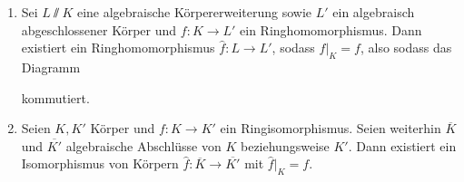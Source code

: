 \documentclass[12pt,a4paper]{scrartcl}
\begin{document}
\begin{satz}[Fortsetzungssatz] \label{thm:fortsetz}
	\leavevmode
	\begin{enumerate}
		\item Sei $L\sslash K$ eine algebraische Körpererweiterung sowie $L'$ ein algebraisch abgeschlossener Körper und $f\colon K\to L'$ ein Ringhomomorphismus. Dann existiert ein Ringhomomorphismus $\hat{f}\colon L\to L'$, sodass $\hat{f}|_K  = f$, also sodass das Diagramm
		\begin{center}
		\end{center}
		kommutiert. \label{enumi:forsetz:1}
		\item Seien $K, K'$ Körper und $f\colon K\to K'$  ein Ringisomorphismus. Seien weiterhin $\overline{K}$ und $\overline{K'}$ algebraische Abschlüsse von $K$ beziehungsweise $K'$. Dann existiert ein Isomorphismus von Körpern $\hat{f}\colon \overline{K}\to \overline{K'}$ mit $\hat{f}|_K = f$. \label{enumi:forsetz:2}
	\end{enumerate}
	
\end{satz}

\end{document}
